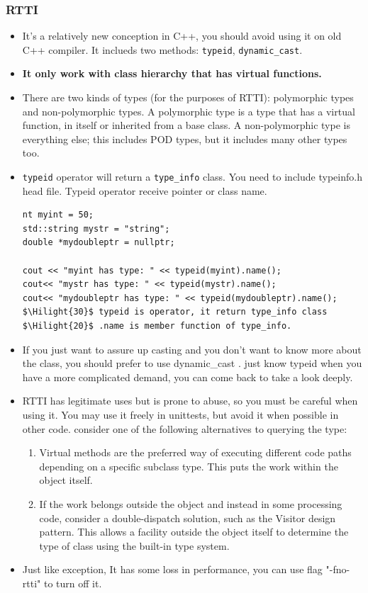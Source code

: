 \documentclass[a4paper,12pt,twoside]{book}
\newcommand{\Hilight}[1]{\makebox[0pt][l]{\color{yellow}\rule[-3pt]{#1em}{11pt}}}
\begin{document}
\subsubsection{RTTI}
\begin{itemize}
\item It's a relatively new conception in C++, you should avoid using it on old C++ compiler. It inclueds two methods: \texttt{typeid}, \texttt{dynamic\_cast}.
\item \textbf{It only work with class hierarchy that has virtual functions. }

\item There are two kinds of types (for the purposes of RTTI): polymorphic types and non-polymorphic types. A polymorphic type is a type that has a virtual function, in itself or inherited from a base class. A non-polymorphic type is everything else; this includes POD types, but it includes many other types too.

\item \texttt{typeid} operator will return a \texttt{type\_info} class.  You need to include typeinfo.h head file. Typeid operator receive pointer or class name.

\begin{lstlisting}
nt myint = 50;
std::string mystr = "string";
double *mydoubleptr = nullptr;

cout << "myint has type: " << typeid(myint).name();
cout<< "mystr has type: " << typeid(mystr).name();
cout<< "mydoubleptr has type: " << typeid(mydoubleptr).name();
$\Hilight{30}$ typeid is operator, it return type_info class
$\Hilight{20}$ .name is member function of type_info.
\end{lstlisting}

\item If you just want to assure up casting and you don't want to know more about the class, you should prefer to use dynamic\_cast . just know typeid when you have a more complicated demand, you can come back to take a look deeply.

\item RTTI has legitimate uses but is prone to abuse, so you must be careful when using it. You may use it freely in unittests, but avoid it when possible in other code. consider one of the following alternatives to querying the type:
\begin{enumerate}
	\item Virtual methods are the preferred way of executing different code paths depending on a specific subclass type. This puts the work within the object itself.
	\item If the work belongs outside the object and instead in some processing code, consider a double-dispatch solution, such as the Visitor design pattern. This allows a facility outside the object itself to determine the type of class using the built-in type system.
\end{enumerate}

\item Just like exception, It has some loss in performance, you can use flag "-fno-rtti" to turn off it.
\end{itemize}
\end{document}
